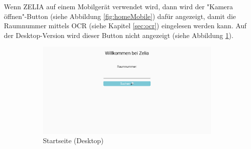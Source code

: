 Wenn ZELIA auf einem Mobilgerät verwendet wird, dann wird der "Kamera öffnen"-Button (siehe Abbildung \ref{fig:homeMobile}) dafür angezeigt, damit die Raumnummer mittels OCR (siehe Kapitel \ref{sec:ocr}) eingelesen werden kann. Auf der Desktop-Version wird dieser Button nicht angezeigt (siehe Abbildung \ref{fig:homeDesktop}).

\begin{figure}[H]
    \begin{subfigure}[c]{0.65\textwidth}
        \centering
        \includegraphics[width=\textwidth]{media/ResponsiveDesign/ZeliaHome.png}
        \caption{Startseite (Desktop)}
        \label{fig:homeDesktop}
    \end{subfigure} \hfill
    \begin{subfigure}[c]{0.35\textwidth}
        \centering

\end{subfigure}
\end{figure}
